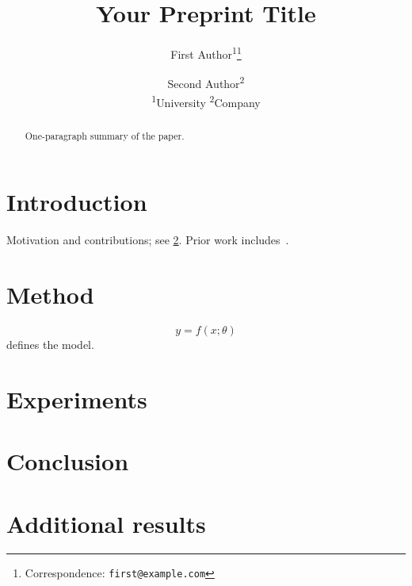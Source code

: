 \documentclass[11pt]{article}
\title{Your Preprint Title}
\author{
  First Author\textsuperscript{1}\thanks{Correspondence: \texttt{first@example.com}} \and
  Second Author\textsuperscript{2} \\[4pt]
  \small \textsuperscript{1}University \quad \textsuperscript{2}Company
}
\date{}
\begin{document}
\maketitle

\begin{abstract}
One-paragraph summary of the paper.
\end{abstract}

\section{Introduction}
\label{sec:intro}
Motivation and contributions; see \cref{sec:method}. Prior work includes~\citet{knuth1984}.

\section{Method}
\label{sec:method}
\begin{equation}
  y = f(x; \theta)
  \label{eq:model}
\end{equation}
 defines the model.

\section{Experiments}
\label{sec:experiments}

\section{Conclusion}




\appendix
\section{Additional results}
\end{document}
